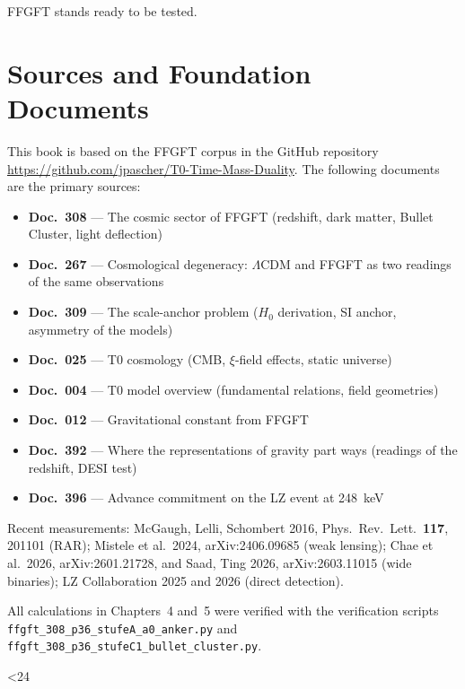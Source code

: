 \documentclass[11pt,oneside]{book}
\begin{document}
FFGFT stands ready to be tested.

\backmatter

\chapter*{Sources and Foundation Documents}

This book is based on the FFGFT corpus in the GitHub
repository \url{https://github.com/jpascher/T0-Time-Mass-Duality}.
The following documents are the primary sources:

\begin{itemize}
  \item \textbf{Doc.~308} — The cosmic sector of FFGFT
    (redshift, dark matter, Bullet Cluster, light deflection)
  \item \textbf{Doc.~267} — Cosmological degeneracy:
    $\Lambda$CDM and FFGFT as two readings of the same observations
  \item \textbf{Doc.~309} — The scale-anchor problem
    ($H_0$ derivation, SI anchor, asymmetry of the models)
  \item \textbf{Doc.~025} — T0 cosmology
    (CMB, $\xi$-field effects, static universe)
  \item \textbf{Doc.~004} — T0 model overview
    (fundamental relations, field geometries)
  \item \textbf{Doc.~012} — Gravitational constant from FFGFT
  \item \textbf{Doc.~392} — Where the representations of gravity
    part ways (readings of the redshift, DESI test)
  \item \textbf{Doc.~396} — Advance commitment on the LZ event at 248~keV
\end{itemize}

Recent measurements: McGaugh, Lelli, Schombert 2016, Phys.\ Rev.\ Lett.\
\textbf{117}, 201101 (RAR); Mistele et al.\ 2024, arXiv:2406.09685
(weak lensing); Chae et al.\ 2026, arXiv:2601.21728, and Saad, Ting
2026, arXiv:2603.11015 (wide binaries); LZ Collaboration 2025 and
2026 (direct detection).

All calculations in Chapters~4 and~5 were verified with the
verification scripts
\texttt{ffgft\_308\_p36\_stufeA\_a0\_anker.py} and
\texttt{ffgft\_308\_p36\_stufeC1\_bullet\_cluster.py}.

\clearpage
\makeatletter
\loop\ifnum\ReadonlyShipoutCounter<24
  \null\thispagestyle{empty}\clearpage
\repeat
\makeatother
\end{document}
